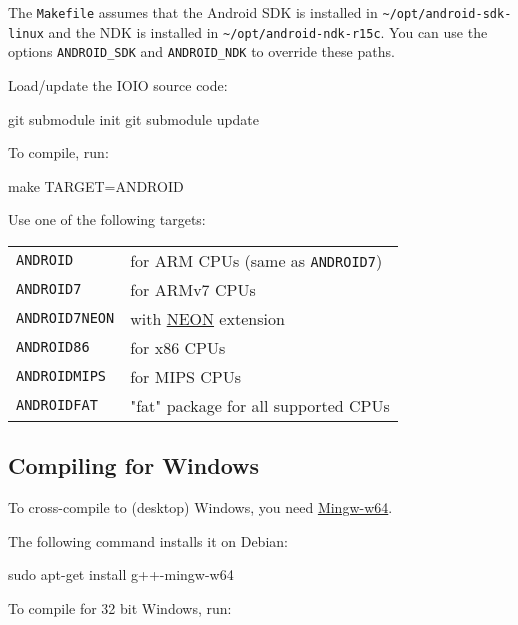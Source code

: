 The \texttt{Makefile} assumes that the Android SDK is installed in
\verb|~/opt/android-sdk-linux| and the NDK is installed in
\verb|~/opt/android-ndk-r15c|.  You can use the options
\verb|ANDROID_SDK| and \verb|ANDROID_NDK| to override these paths.

Load/update the IOIO source code:

\begin{verbatim*}
git submodule init
git submodule update
\end{verbatim*}

To compile, run:

\begin{verbatim*}
make TARGET=ANDROID
\end{verbatim*}

Use one of the following targets:

\begin{tabularx}{1.9\textwidth}{lX}

\texttt{ANDROID} & for ARM CPUs (same as \texttt{ANDROID7}) \\

\texttt{ANDROID7} & for ARMv7 CPUs \\

\texttt{ANDROID7NEON} & with
\href{http://www.arm.com/products/processors/technologies/neon.php}{NEON}
extension \\

\texttt{ANDROID86} & for x86 CPUs \\

\texttt{ANDROIDMIPS} & for MIPS CPUs \\

\texttt{ANDROIDFAT} & "fat" package for all supported CPUs \\

\end{tabularx}

\subsection{Compiling for Windows}

To cross-compile to (desktop) Windows, you need
\href{http://mingw-w64.org}{Mingw-w64}.

The following command installs it on Debian:

\begin{verbatim*}
sudo apt-get install g++-mingw-w64
\end{verbatim*}

To compile for 32 bit Windows, run:

